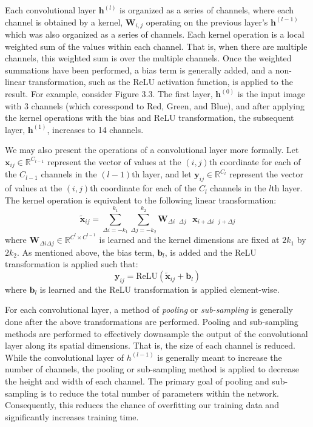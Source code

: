 \documentclass [MAS] {uclathes}
\begin{document}
Each convolutional layer $\mathbf{h}^{(l)}$ is organized as a series of channels, where each channel is obtained by a kernel, $\mathbf{W}_{i, j}$ operating on the previous layer's $\mathbf{h}^{(l-1)}$ which was also organized as a series of channels.  Each kernel operation is a local weighted sum of the values within each channel. That is, when there are multiple channels, this weighted sum is over the multiple channels. Once the weighted summations have been performed, a bias term is generally added, and a non-linear transformation, such as the ReLU activation function, is applied to the result. For example, consider Figure 3.3. The first layer, $\mathbf{h}^{(0)}$ is the input image with 3 channels (which coresspond to Red, Green, and Blue), and after applying the kernel operations with the bias and ReLU transformation, the subsequent layer, $\mathbf{h}^{(1)}$, increases to 14 channels. 

We may also present the operations of a convolutional layer more formally. Let $\mathbf{x}_{i j} \in \mathbb{R}^{C_{l-1}}$ represent the vector of values at the $(i, j)$th coordinate for each of the $C_{l-1}$ channels in the $(l-1)$th layer, and let $\mathbf{y}_{i j} \in \mathbb{R}^{C_{l}}$ represent the vector of values at the $(i, j)$th coordinate for each of the $C_{l}$ channels in the $l$th layer. The kernel operation is equivalent to the following linear transformation: $$\tilde{\mathbf{x}}_{i j} = \sum_{\Delta i = -k_1}^{k_1} \sum_{\Delta j = -k_2}^{k_2} \mathbf{W}_{\Delta i \text{ } \Delta j} \text{ } \mathbf{x}_{i+\Delta i \text{ } j+\Delta j}$$ where $\mathbf{W}_{\Delta i \Delta j} \in \mathbb{R}^{C^{l} \times C^{l-1}}$ is learned and the kernel dimensions are fixed at $2k_1$ by $2k_2$. As mentioned above, the bias term, $\mathbf{b}_{l}$, is added and the ReLU transformation is applied such that: $$\mathbf{y}_{i j} = \text{ReLU}(\tilde{\mathbf{x}}_{i j} + \mathbf{b}_{l})$$ where $\mathbf{b}_{l}$ is learned and the ReLU transformation is applied element-wise.

For each convolutional layer, a method of \textit{pooling} or \textit{sub-sampling} is generally done after the above transformations are performed. Pooling and sub-sampling methods are performed to effectively downsample the output of the convolutional layer along its spatial dimensions. That is, the size of each channel is reduced. While the convolutional layer of $h^{(l-1)}$ is generally meant to increase the number of channels, the pooling or sub-sampling method is applied to decrease the height and width of each channel. The primary goal of pooling and sub-sampling is to reduce the total number of parameters within the network. Consequently, this reduces the chance of overfitting our training data and significantly increases training time.
\end{document}
